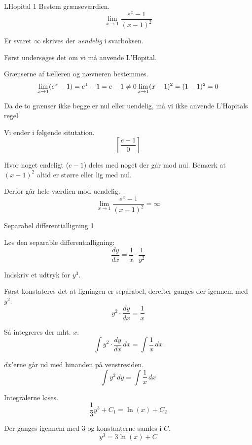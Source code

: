\documentclass{article}
\begin{document}
\begin{exercise}{LHopital 1}
Bestem grænseværdien.
\[
\lim_{x \to 1} \frac{e^x - 1}{(x - 1)^2}
\]

Er svaret $\infty$ skrives der \emph{uendelig} i svarboksen.


\hint
Først undersøges det om vi må anvende L'Hopital.

\hint
Grænserne af tælleren og nævneren bestemmes.
\[
\lim_{x \to 1} (e^x - 1) = e^1 - 1 = e - 1 \neq 0 \\
\lim_{x \to 1} (x - 1)^2 = (1 - 1)^2 = 0
\]

\hint
Da de to grænser ikke begge er nul eller uendelig, må vi ikke anvende L'Hopitals regel. 

\hint
Vi ender i følgende situtation.
\[
\left[ \frac{e - 1}{0} \right]
\]

\hint
Hvor noget endeligt ($e - 1$) deles med noget der går mod nul.
Bemærk at $(x - 1)^2$ altid er større eller lig med nul. 

Derfor går hele værdien mod uendelig.
\[
\lim_{x \to 1} \frac{e^x - 1}{(x - 1)^2} = \infty
\]

\end{exercise}

\begin{exercise}{Separabel differentialligning 1}

Løs den separable differentialligning:
\[
\frac{dy}{dx} = \frac{1}{x} \cdot \frac{1}{y^2}
\]

Indskriv et udtryk for $y^3$.


\hint


Først konstateres det at ligningen er separabel, derefter 
ganges der igennem med $y^2$.
\[
y^2 \cdot \frac{dy}{dx} = \frac{1}{x}
\]

\hint
Så integreres der mht. $x$.
\[
\int y^2 \cdot \frac{dy}{dx} \, dx = \int \frac{1}{x} \, dx
\]

\hint
$dx$'erne går ud med hinanden på venstresiden.
\[
\int y^2 \, dy = \int \frac{1}{x} \, dx
\]

\hint
Integralerne løses.
\[
\frac{1}{3} y^3 + C_1 = \ln(x) + C_2
\]

\hint
Der ganges igennem med 3 og konstanterne samles i $C$.
\[
y^3 = 3 \ln(x) + C
\]

\end{exercise}
\end{document}
